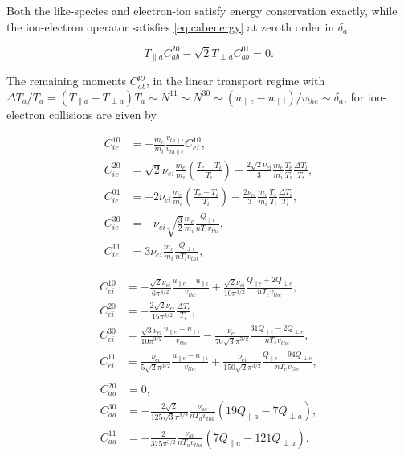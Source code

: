 \noindent Both the like-species and electron-ion satisfy energy conservation exactly, {while the ion-electron operator satisfies \cref{eq:cabenergy} at zeroth order in $\delta_a$}

\begin{equation}
    T_{\parallel a}C_{ab}^{20}-\sqrt{2}T_{\perp a} C_{ab}^{01} = 0.
    \label{eq:cabenergy}
\end{equation}

{The remaining moments $C_{ab}^{pj}$, in the linear transport regime with $\Delta T_a/T_a = (T_{\parallel a} - T_{\perp a})T_a \sim N^{11}\sim N^{30} \sim (u_{\parallel e}-u_{\parallel i})/v_{the} \sim \delta_a$, for ion-electron collisions are given by}

\begin{align}
    C_{ie}^{10}&=-\frac{m_e}{m_i}\frac{v_{th \parallel i}}{v_{th \parallel e}}C_{ei}^{10},\\
    C_{ie}^{20}&=\sqrt{2}\nu_{ei}\frac{m_e}{m_i}\left(\frac{T_e-T_i}{T_i}\right)-\frac{2 \sqrt{2} \nu_{ei}}{3}\frac{m_e}{m_i}\frac{T_e}{T_i}\frac{\Delta T_i}{T_i},\\
    C_{ie}^{01}&=-2\nu_{ei}\frac{m_e}{m_i}\left(\frac{T_e-T_i}{T_i}\right)-\frac{2 \nu_{ei}}{3}\frac{m_e}{m_i}\frac{T_e}{T_i}\frac{\Delta T_i}{T_i},\\
    C_{ie}^{30}&=-\nu_{ei}\sqrt{\frac{3}{2}}\frac{m_e}{m_i}\frac{Q_{\parallel i}}{n T_i v_{thi}},\\
    C_{ie}^{11}&=3 \nu_{ei}\frac{m_e}{m_i}\frac{Q_{\perp i}}{n T_i v_{thi}},
\end{align}


{
\begin{align}
    C_{ei}^{10} &= -\frac{\sqrt{2}\nu_{ei}}{6 \pi^{3/2}}\frac{u_{\parallel e}-u_{\parallel i}}{v_{the}}+\frac{\sqrt{2}\nu_{ei}}{10 \pi^{3/2}}\frac{Q_{\parallel e}+2 Q_{\perp e}}{n T_e v_{the}},\\
    C_{ei}^{20}&=-\frac{2 \sqrt{2}\nu_{ei}}{15 \pi^{3/2}}\frac{\Delta T_e}{T_e},\\
    C_{ei}^{30}&= \frac{\sqrt{3}\nu_{ei}}{10 \pi^{3/2}}\frac{u_{\parallel e}-u_{\parallel i}}{v_{the}}-\frac{ \nu_{ei}}{70 \sqrt{3} \pi^{3/2}}\frac{31 Q_{\parallel e} - 2 Q_{\perp e}}{n T_e v_{the}},\\
    C_{ei}^{11}&= \frac{ \nu_{ei}}{5 \sqrt{2} \pi^{3/2}}\frac{u_{\parallel e}-u_{\parallel i}}{v_{the}}+\frac{ \nu_{ei}}{150 \sqrt{2} \pi^{3/2}}\frac{Q_{\parallel e}-94 Q_{\perp e}}{n T_e v_{the}},\\
\end{align}
}
{
\begin{align}
    C_{aa}^{20}&=0,\\
    C_{aa}^{30}&=-\frac{2 \sqrt{2}}{125 \sqrt{3} \pi^{3/2}}\frac{\nu_{aa}}{n T_a v_{tha}}\left(19 Q_{\parallel a}-7 Q_{\perp a}\right),\\
    C_{aa}^{11}&=-\frac{2}{375 \pi^{3/2}}\frac{\nu_{aa}}{n T_a v_{tha}}\left(7 Q_{\parallel a}-121 Q_{\perp a}\right).
\end{align}
}



